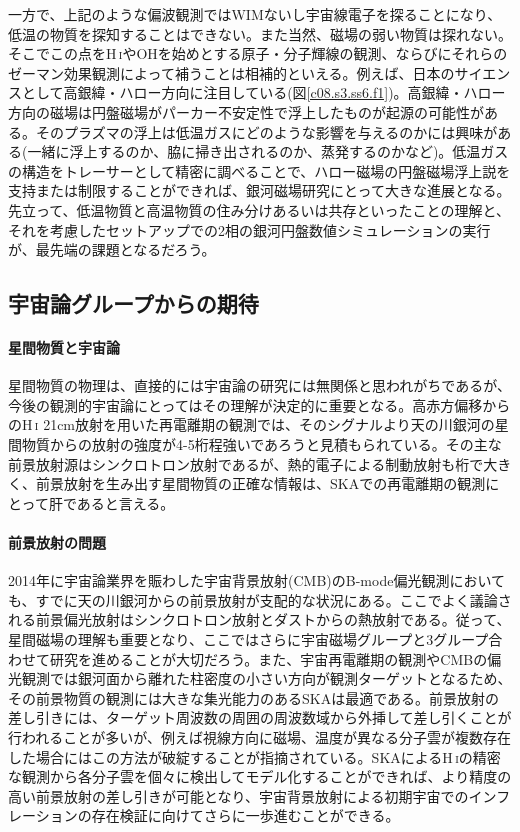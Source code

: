 一方で、上記のような偏波観測ではWIMないし宇宙線電子を探ることになり、低温の物質を探知することはできない。また当然、磁場の弱い物質は探れない。そこでこの点をH\,\textsc{i}やOHを始めとする原子・分子輝線の観測、ならびにそれらのゼーマン効果観測によって補うことは相補的といえる。例えば、日本のサイエンスとして高銀緯・ハロー方向に注目している(図\ref{c08.s3.ss6.f1})。高銀緯・ハロー方向の磁場は円盤磁場がパーカー不安定性で浮上したものが起源の可能性がある。そのプラズマの浮上は低温ガスにどのような影響を与えるのかには興味がある(一緒に浮上するのか、脇に掃き出されるのか、蒸発するのかなど)。低温ガスの構造をトレーサーとして精密に調べることで、ハロー磁場の円盤磁場浮上説を支持または制限することができれば、銀河磁場研究にとって大きな進展となる。先立って、低温物質と高温物質の住み分けあるいは共存といったことの理解と、それを考慮したセットアップでの2相の銀河円盤数値シミュレーションの実行が、最先端の課題となるだろう。


\subsection{宇宙論グループからの期待}\label{c08.s4.ss7}

\paragraph{星間物質と宇宙論}

星間物質の物理は、直接的には宇宙論の研究には無関係と思われがちであるが、今後の観測的宇宙論にとってはその理解が決定的に重要となる。高赤方偏移からのH\,\textsc{i} 21cm放射を用いた再電離期の観測では、そのシグナルより天の川銀河の星間物質からの放射の強度が4-5桁程強いであろうと見積もられている\citep{2005ApJ...625..575S}。その主な前景放射源はシンクロトロン放射であるが、熱的電子による制動放射も桁で大きく、前景放射を生み出す星間物質の正確な情報は、SKAでの再電離期の観測にとって肝であると言える\citep{2014PTEP.2014fB109I}。

\paragraph{前景放射の問題}

2014年に宇宙論業界を賑わした宇宙背景放射(CMB)のB-mode偏光観測においても、すでに天の川銀河からの前景放射が支配的な状況にある。ここでよく議論される前景偏光放射はシンクロトロン放射とダストからの熱放射である。従って、星間磁場の理解も重要となり、ここではさらに宇宙磁場グループと3グループ合わせて研究を進めることが大切だろう。また、宇宙再電離期の観測やCMBの偏光観測では銀河面から離れた柱密度の小さい方向が観測ターゲットとなるため、その前景物質の観測には大きな集光能力のあるSKAは最適である。前景放射の差し引きには、ターゲット周波数の周囲の周波数域から外挿して差し引くことが行われることが多いが、例えば視線方向に磁場、温度が異なる分子雲が複数存在した場合にはこの方法が破綻することが指摘されている\citep{2014arXiv1410.8136T}。SKAによるH\,\textsc{i}の精密な観測から各分子雲を個々に検出してモデル化することができれば、より精度の高い前景放射の差し引きが可能となり、宇宙背景放射による初期宇宙でのインフレーションの存在検証に向けてさらに一歩進むことができる。
